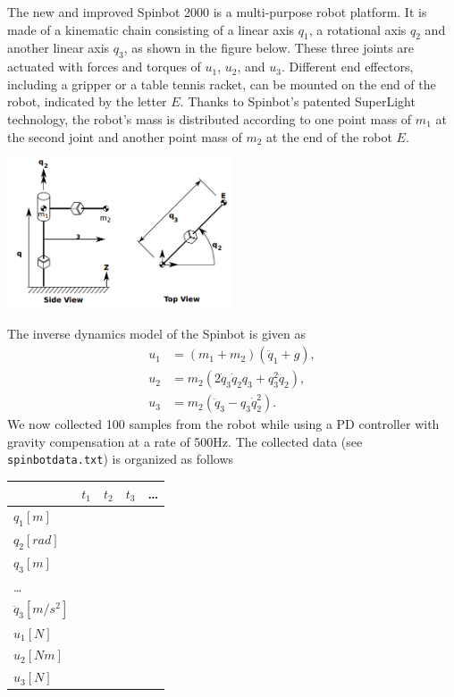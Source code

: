 
The new and improved Spinbot 2000 is a multi-purpose robot platform.
It is made of a kinematic chain consisting of a linear axis $q_{1}$, a rotational axis $q_{2}$ and another linear axis $q_{3}$, as shown in the figure below.
These three joints are actuated with forces and torques of $u_{1}$, $u_{2}$, and $u_{3}$.
Different end effectors, including a gripper or a table tennis racket, can be mounted on the end of the robot, indicated by the letter $E$.
Thanks to Spinbot's patented SuperLight technology, the robot's mass is distributed according to one point mass of $m_{1}$ at the second joint and another point mass of $m_{2}$ at the end of the robot $E$.

\includegraphics[width=0.5\textwidth]{img/spinbot.png}

The inverse dynamics model of the Spinbot is given as
\begin{align*}
u_{1} &= (m_{1}+m_{2})(\ddot{q}_{1}+g),\\
u_{2} &= m_{2}(2\dot{q}_{3}\dot{q}_{2}q_{3}+q_{3}^{2}\ddot{q}_{2}),\\
u_{3} &= m_{2}(\ddot{q}_{3}-q_{3}\dot{q}_{2}^{2}).
\end{align*}
We now collected 100 samples from the robot while using a PD controller with gravity compensation at a rate of 500Hz.
The collected data (see \texttt{spinbotdata.txt}) is organized as follows\\
\begin{tabular}{| l || c | c | c | l  }
  \hline
   & $t_1$ & $t_2$ & $t_3$ & \ldots\\
  \hline
  \hline
  $q_{1}[m]$ &  &  &  & \\
  \hline
  $q_{2}[rad]$ &  &  &  & \\
  \hline
  $q_{3}[m]$ &  &  &  & \\
  \hline
  \ldots &  &  &  &  \\
  \hline
  $\ddot{q}_{3}[m/s^{2}]$ &  &  &  & \\
  \hline
  $u_{1}[N]$ &  &  &  & \\
  \hline
  $u_{2}[Nm]$ &  &  &  & \\
  \hline
  $u_{3}[N]$ &  &  &  & \\
  \hline
\end{tabular}


